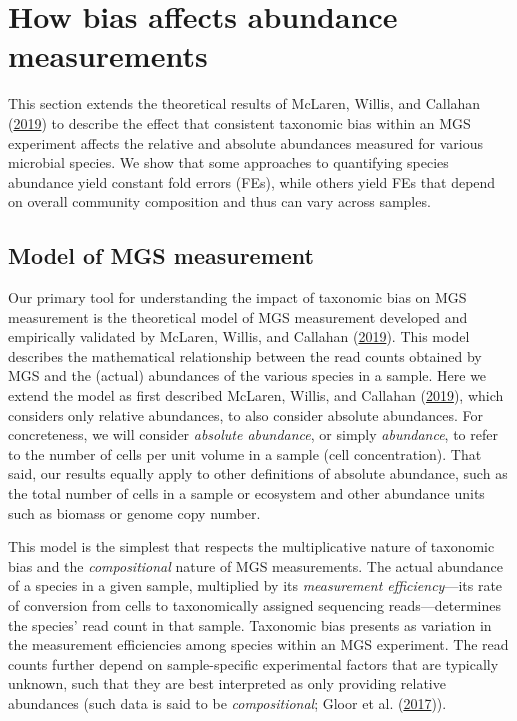 \documentclass[
]{article}
\begin{document}
\hypertarget{abundance-measurement}{%
\section{How bias affects abundance measurements}\label{abundance-measurement}}

This section extends the theoretical results of McLaren, Willis, and Callahan (\protect\hyperlink{ref-mclaren2019cons}{2019}) to describe the effect that consistent taxonomic bias within an MGS experiment affects the relative and absolute abundances measured for various microbial species.
We show that some approaches to quantifying species abundance yield constant fold errors (FEs), while others yield FEs that depend on overall community composition and thus can vary across samples.

\hypertarget{model-of-mgs-measurement}{%
\subsection{Model of MGS measurement}\label{model-of-mgs-measurement}}

Our primary tool for understanding the impact of taxonomic bias on MGS measurement is the theoretical model of MGS measurement developed and empirically validated by McLaren, Willis, and Callahan (\protect\hyperlink{ref-mclaren2019cons}{2019}).
This model describes the mathematical relationship between the read counts obtained by MGS and the (actual) abundances of the various species in a sample.
Here we extend the model as first described McLaren, Willis, and Callahan (\protect\hyperlink{ref-mclaren2019cons}{2019}), which considers only relative abundances, to also consider absolute abundances.
For concreteness, we will consider \emph{absolute abundance}, or simply \emph{abundance}, to refer to the number of cells per unit volume in a sample (cell concentration).
That said, our results equally apply to other definitions of absolute abundance, such as the total number of cells in a sample or ecosystem and other abundance units such as biomass or genome copy number.

This model is the simplest that respects the multiplicative nature of taxonomic bias and the \emph{compositional} nature of MGS measurements.
The actual abundance of a species in a given sample, multiplied by its \emph{measurement efficiency}---its rate of conversion from cells to taxonomically assigned sequencing reads---determines the species' read count in that sample.
Taxonomic bias presents as variation in the measurement efficiencies among species within an MGS experiment.
The read counts further depend on sample-specific experimental factors that are typically unknown, such that they are best interpreted as only providing relative abundances (such data is said to be \emph{compositional}; Gloor et al. (\protect\hyperlink{ref-gloor2017micr}{2017})).
\end{document}
